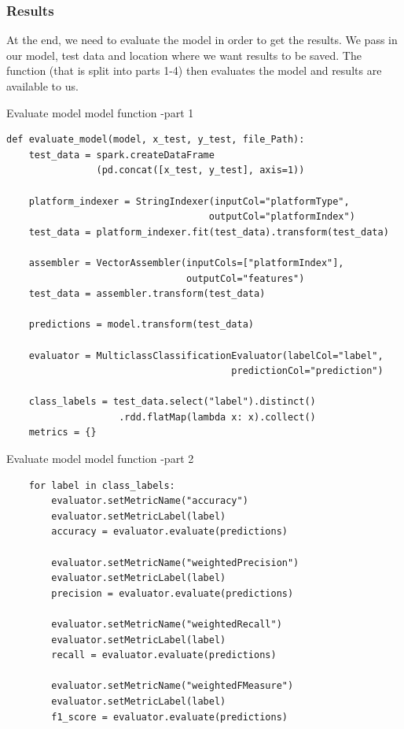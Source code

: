 \subsubsection{Results}

At the end, we need to evaluate the model in order to get the results. We pass in our model, test data and location where we want results to be saved. The function (that is split into parts 1-4) then evaluates the model and results are available to us.
\begin{listing}[H]
\caption{Evaluate model model function -part 1}
\begin{verbatim}
def evaluate_model(model, x_test, y_test, file_Path):
    test_data = spark.createDataFrame
                (pd.concat([x_test, y_test], axis=1))

    platform_indexer = StringIndexer(inputCol="platformType", 
                                    outputCol="platformIndex")
    test_data = platform_indexer.fit(test_data).transform(test_data)

    assembler = VectorAssembler(inputCols=["platformIndex"], 
                                outputCol="features")
    test_data = assembler.transform(test_data)

    predictions = model.transform(test_data)

    evaluator = MulticlassClassificationEvaluator(labelCol="label", 
                                        predictionCol="prediction")

    class_labels = test_data.select("label").distinct()
                    .rdd.flatMap(lambda x: x).collect()
    metrics = {}

\end{verbatim}
\end{listing}

\begin{listing}[H]
\caption{Evaluate model model function -part 2}
\begin{verbatim}
    for label in class_labels:
        evaluator.setMetricName("accuracy")
        evaluator.setMetricLabel(label)
        accuracy = evaluator.evaluate(predictions)

        evaluator.setMetricName("weightedPrecision")
        evaluator.setMetricLabel(label)
        precision = evaluator.evaluate(predictions)

        evaluator.setMetricName("weightedRecall")
        evaluator.setMetricLabel(label)
        recall = evaluator.evaluate(predictions)

        evaluator.setMetricName("weightedFMeasure")
        evaluator.setMetricLabel(label)
        f1_score = evaluator.evaluate(predictions)

\end{verbatim}
\end{listing}

